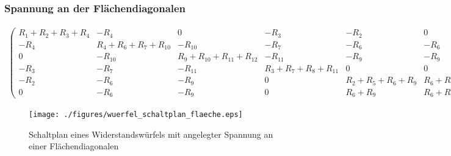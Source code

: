 \documentclass[10pt,a4paper]{article}
\begin{document}
\begin{landscape}
\subsubsection{Spannung an der Flächendiagonalen}
\thispagestyle{empty}
\begin{align}
\begin{pmatrix}
R_1+R_2+R_3+R_4 &  -R_4  &  0  &  -R_3  &  -R_2  &  0  \\ 
-R_4 & R_4+R_6+R_7+R_{10} & -R_{10} & -R_7 & -R_6 & -R_6 \\ 
 0  & -R_{10} & R_9+R_{10}+R_{11}+R_{12} & -R_{11} & -R_9 & -R_9 \\ 
-R_3 & -R_7 & -R_11 & R_3+R_7+R_8+R_{11} & 0 & 0 \\ 
-R_2 & -R_6 & -R_9 & 0 & R_2+R_5+R_6+R_9 & R_6+R_9 \\ 
 0  & -R_6 & -R_9 &  0  & R_6+R_9 & R_6+R_9
\end{pmatrix}
\begin{pmatrix}
I_1\\I_2\\I_3\\I_4\\I_5\\I_{ges}
\end{pmatrix}
=
\begin{pmatrix}
0\\0\\0\\0\\0\\U
\end{pmatrix}
\label{eqn:wuerfel_flaeche}
\end{align}

\begin{figure}[htbp!]
\centering
\texttt{[image: ./figures/wuerfel\_schaltplan\_flaeche.eps]}
\caption{Schaltplan eines Widerstandswürfels mit angelegter Spannung an einer Flächendiagonalen}
\label{fig:wuerfel_schaltplan_flaeche}
\end{figure}


\end{landscape}
\end{document}
